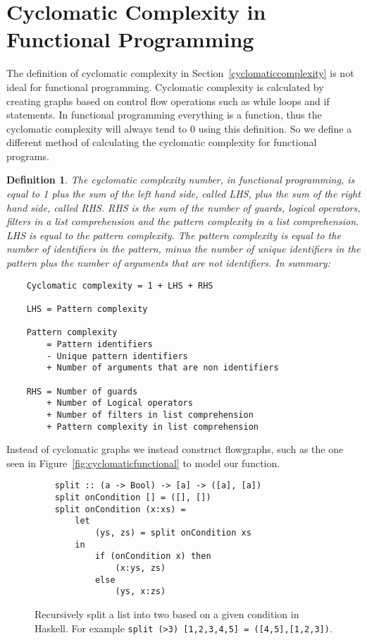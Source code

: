 \documentclass[12pt]{report}
\newtheorem*{definition}{Definition}
\theoremstyle{definition}
\theoremstyle{theorem}
\begin{document}
\section{Cyclomatic Complexity in Functional Programming}

The definition of cyclomatic complexity in Section~\ref{cyclomaticcomplexity} is
not ideal for functional programming. Cyclomatic complexity is calculated by
creating graphs based on control flow operations such as while loops and if
statements. In functional programming everything is a function, thus the
cyclomatic complexity will always tend to 0 using this definition. So we define
a different method of calculating the cyclomatic complexity for functional
programs. 

\theoremstyle{definition} 
    \begin{definition} 
    The cyclomatic complexity number, in functional programming, is equal to
    1 plus the sum of the left hand side, called LHS, plus the sum of the
    right hand side, called RHS. RHS is the sum of the number of guards,
    logical operators, filters in a list comprehension and the pattern
    complexity in a list comprehension. LHS is equal to the pattern
    complexity.  The pattern complexity is equal to the number of
    identifiers in the pattern, minus the number of unique identifiers in
    the pattern plus the number of arguments that are not identifiers. In
    summary:

    \begin{lstlisting}
    Cyclomatic complexity = 1 + LHS + RHS

    LHS = Pattern complexity 

    Pattern complexity   
        = Pattern identifiers 
        - Unique pattern identifiers 
        + Number of arguments that are non identifiers

    RHS = Number of guards 
        + Number of Logical operators 
        + Number of filters in list comprehension 
        + Pattern complexity in list comprehension
    \end{lstlisting}
\end{definition}

Instead of cyclomatic graphs we instead construct flowgraphs, such as the one
seen in Figure~\ref{fig:cyclomaticfunctional} to model our function.

\begin{figure}[H]
    \begin{lstlisting}
    split :: (a -> Bool) -> [a] -> ([a], [a])
    split onCondition [] = ([], [])
    split onCondition (x:xs) =
        let 
            (ys, zs) = split onCondition xs
        in 
            if (onCondition x) then 
                (x:ys, zs)
            else 
                (ys, x:zs)
    \end{lstlisting}
    \label{split}
    \caption{Recursively split a list into two based on a given condition in
    Haskell. For example \texttt{split (>3) [1,2,3,4,5] =
    ([4,5],[1,2,3])}.}
\end{figure}
\end{document}
